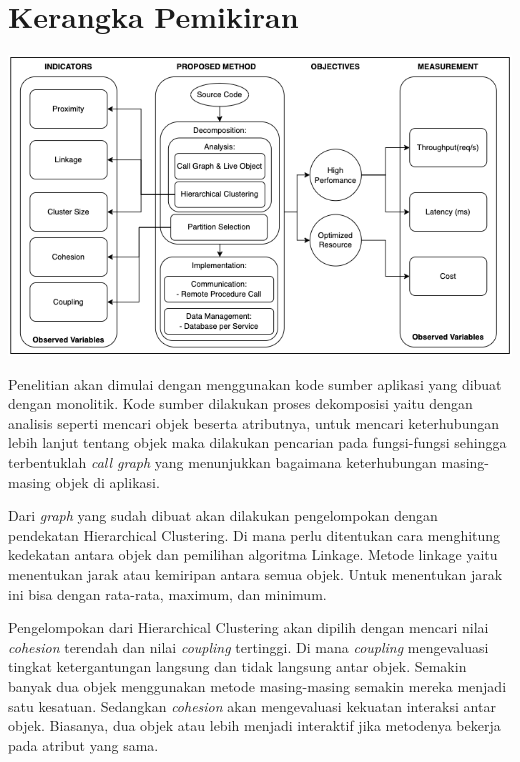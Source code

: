 \section{Kerangka Pemikiran}
\begin{center}
	\includegraphics[width=14cm]{img/KerangkaPemikiran.png}
	\label{fig:asd}
\end{center}

Penelitian akan dimulai dengan menggunakan kode sumber aplikasi yang dibuat dengan monolitik. Kode sumber dilakukan proses dekomposisi yaitu dengan analisis seperti mencari objek beserta atributnya, untuk mencari keterhubungan lebih lanjut tentang objek maka dilakukan pencarian pada fungsi-fungsi sehingga terbentuklah \textit{call graph} yang menunjukkan bagaimana keterhubungan masing-masing objek di aplikasi.

Dari \textit{graph} yang sudah dibuat akan dilakukan pengelompokan dengan pendekatan Hierarchical Clustering. Di mana perlu ditentukan cara menghitung kedekatan antara objek dan pemilihan algoritma Linkage. Metode linkage yaitu menentukan jarak atau kemiripan antara semua objek. Untuk menentukan jarak ini bisa dengan rata-rata, maximum, dan minimum.

Pengelompokan dari Hierarchical Clustering akan dipilih dengan mencari nilai \textit{cohesion} terendah dan  nilai \textit{coupling} tertinggi. Di mana \textit{coupling} mengevaluasi tingkat ketergantungan langsung dan tidak langsung antar objek. Semakin banyak dua objek menggunakan metode masing-masing semakin mereka menjadi satu kesatuan. Sedangkan  \textit{cohesion} akan mengevaluasi kekuatan interaksi antar objek. Biasanya, dua objek atau lebih menjadi interaktif jika metodenya bekerja pada atribut yang sama.

